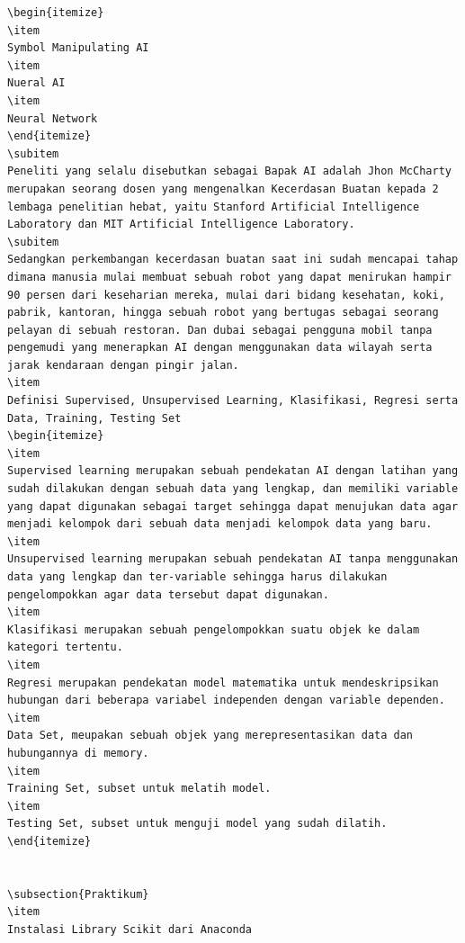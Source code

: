 \begin{enumerate}
\begin{itemize}
\begin{verbatim}
\begin{itemize}
\item
Symbol Manipulating AI
\item
Nueral AI
\item
Neural Network
\end{itemize}
\subitem
Peneliti yang selalu disebutkan sebagai Bapak AI adalah Jhon McCharty  merupakan seorang dosen yang mengenalkan Kecerdasan Buatan kepada 2 lembaga penelitian hebat, yaitu Stanford Artificial Intelligence Laboratory dan MIT Artificial Intelligence Laboratory.
\subitem
Sedangkan perkembangan kecerdasan buatan saat ini sudah mencapai tahap dimana manusia mulai membuat sebuah robot yang dapat menirukan hampir 90 persen dari keseharian mereka, mulai dari bidang kesehatan, koki, pabrik, kantoran, hingga sebuah robot yang bertugas sebagai seorang pelayan di sebuah restoran. Dan dubai sebagai pengguna mobil tanpa pengemudi yang menerapkan AI dengan menggunakan data wilayah serta jarak kendaraan dengan pingir jalan.
\item
Definisi Supervised, Unsupervised Learning, Klasifikasi, Regresi serta Data, Training, Testing Set
\begin{itemize}
\item
Supervised learning merupakan sebuah pendekatan AI dengan latihan yang sudah dilakukan dengan sebuah data yang lengkap, dan memiliki variable yang dapat digunakan sebagai target sehingga dapat menujukan data agar menjadi kelompok dari sebuah data menjadi kelompok data yang baru.
\item
Unsupervised learning merupakan sebuah pendekatan AI tanpa menggunakan data yang lengkap dan ter-variable sehingga harus dilakukan pengelompokkan agar data tersebut dapat digunakan.
\item
Klasifikasi merupakan sebuah pengelompokkan suatu objek ke dalam kategori tertentu.
\item
Regresi merupakan pendekatan model matematika untuk mendeskripsikan hubungan dari beberapa variabel independen dengan variable dependen.
\item
Data Set, meupakan sebuah objek yang merepresentasikan data dan hubungannya di memory. 
\item
Training Set, subset untuk melatih model.
\item
Testing Set, subset untuk menguji model yang sudah dilatih.
\end{itemize}


\subsection{Praktikum}
\item
Instalasi Library Scikit dari Anaconda


\end{verbatim}
\end{itemize}
\end{enumerate}
